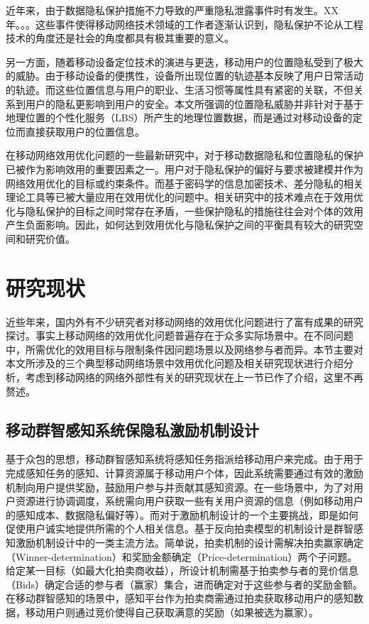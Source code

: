 近年来，由于数据隐私保护措施不力导致的严重隐私泄露事件时有发生。XX年。。。这些事件使得移动网络技术领域的工作者逐渐认识到，隐私保护不论从工程技术的角度还是社会的角度都具有极其重要的意义。



另一方面，随着移动设备定位技术的演进与更迭，移动用户的位置隐私受到了极大的威胁。由于移动设备的便携性，设备所出现位置的轨迹基本反映了用户日常活动的轨迹。而这些位置信息与用户的职业、生活习惯等属性具有紧密的关联，不但关系到用户的隐私更影响到用户的安全。本文所强调的位置隐私威胁并非针对于基于地理位置的个性化服务（LBS）所产生的地理位置数据，而是通过对移动设备的定位而直接获取用户的位置信息。

在移动网络效用优化问题的一些最新研究中，对于移动数据隐私和位置隐私的保护已被作为影响效用的重要因素之一。用户对于隐私保护的偏好与要求被建模并作为网络效用优化的目标或约束条件。而基于密码学的信息加密技术、差分隐私\cite{}的相关理论工具等已被大量应用在效用优化的问题中。相关研究中的技术难点在于效用优化与隐私保护的目标之间时常存在矛盾，一些保护隐私的措施往往会对个体的效用产生负面影响。因此，如何达到效用优化与隐私保护之间的平衡具有较大的研究空间和研究价值。


\fi

\section{研究现状}

近些年来，国内外有不少研究者对移动网络的效用优化问题进行了富有成果的研究探讨。事实上移动网络的效用优化问题普遍存在于众多实际场景中。在不同问题中，所需优化的效用目标与限制条件因问题场景以及网络参与者而异。本节主要对本文所涉及的三个典型移动网络场景中效用优化问题及相关研究现状进行介绍分析，考虑到移动网络的网络外部性有关的研究现状在上一节已作了介绍，这里不再赘述。

\subsection{移动群智感知系统保隐私激励机制设计}

基于众包的思想，移动群智感知系统将感知任务指派给移动用户来完成。由于用于完成感知任务的感知、计算资源属于移动用户个体，因此系统需要通过有效的激励机制向用户提供奖励，鼓励用户参与并贡献其感知资源。在一些场景中，为了对用户资源进行协调调度，系统需向用户获取一些有关用户资源的信息（例如移动用户的感知成本、数据隐私偏好等）。而对于激励机制设计的一个主要挑战，即是如何促使用户诚实地提供所需的个人相关信息。基于反向拍卖模型的机制设计是群智感知激励机制设计中的一类主流方法\cite{yang2012crowdsourcing}。简单说，拍卖机制的设计需解决拍卖赢家确定（Winner-determination）和奖励金额确定（Price-determination）两个子问题。给定某一目标（如最大化拍卖商收益），所设计机制需基于拍卖参与者的竞价信息（Bids）确定合适的参与者（赢家）集合，进而确定对于这些参与者的奖励金额。在移动群智感知的场景中，感知平台作为拍卖商需通过拍卖获取移动用户的感知数据，移动用户则通过竞价使得自己获取满意的奖励（如果被选为赢家）。

